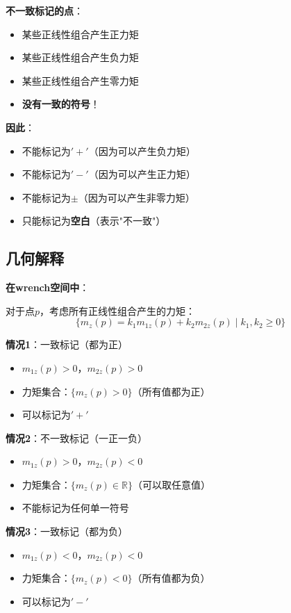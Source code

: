 \documentclass[12pt,a4paper]{article}
\begin{document}
\textbf{不一致标记的点}：
\begin{itemize}
\item 某些正线性组合产生正力矩
\item 某些正线性组合产生负力矩
\item 某些正线性组合产生零力矩
\item \textbf{没有一致的符号}！
\end{itemize}

\textbf{因此}：
\begin{itemize}
\item 不能标记为$'+'$（因为可以产生负力矩）
\item 不能标记为$'-'$（因为可以产生正力矩）
\item 不能标记为$\pm$（因为可以产生非零力矩）
\item 只能标记为\textbf{空白}（表示"不一致"）
\end{itemize}

\subsection{几何解释}

\textbf{在wrench空间中}：

对于点$p$，考虑所有正线性组合产生的力矩：
\begin{equation}
\{m_z(p) = k_1 m_{1z}(p) + k_2 m_{2z}(p) \mid k_1, k_2 \geq 0\}
\end{equation}

\textbf{情况1}：一致标记（都为正）
\begin{itemize}
\item $m_{1z}(p) > 0$，$m_{2z}(p) > 0$
\item 力矩集合：$\{m_z(p) > 0\}$（所有值都为正）
\item 可以标记为$'+'$
\end{itemize}

\textbf{情况2}：不一致标记（一正一负）
\begin{itemize}
\item $m_{1z}(p) > 0$，$m_{2z}(p) < 0$
\item 力矩集合：$\{m_z(p) \in \mathbb{R}\}$（可以取任意值）
\item 不能标记为任何单一符号
\end{itemize}

\textbf{情况3}：一致标记（都为负）
\begin{itemize}
\item $m_{1z}(p) < 0$，$m_{2z}(p) < 0$
\item 力矩集合：$\{m_z(p) < 0\}$（所有值都为负）
\item 可以标记为$'-'$
\end{itemize}
\end{document}
